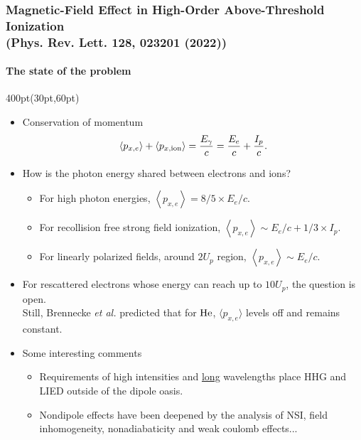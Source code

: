 \begin{frame}
\frametitle{Magnetic-Field Effect in High-Order Above-Threshold Ionization \\
\small (Phys. Rev. Lett. 128, 023201 (2022))}
\framesubtitle{The state of the problem}

\small
\begin{textblock*}{400pt}(30pt,60pt)
\begin{itemize}
\item Conservation of momentum
\begin{align}
\footnotesize
\left\langle p_{x,e} \right\rangle + \left\langle p_{x,\rm ion} \right\rangle
 = \frac{E_\gamma}{c} 
 = \frac{E_e}{c} + \frac{I_p}{c}. \nonumber
\end{align}
\item How is the photon energy shared between electrons and ions?
\begin{itemize}
 \footnotesize
 \item[$\bullet$] For high photon energies, \hspace{10pt}
   $\left\langle p_{x,e}\right\rangle = 8/5\times E_e/c.$
 \item[$\bullet$] For recollision free strong field ionization, %
 \hspace{10pt}
   $\left\langle p_{x,e} \right\rangle \sim E_e/c + 1/3\times I_p.$
 \item[$\bullet$] For linearly polarized fields, around $2U_p$ region, 
   \hspace{10pt}
   $\left\langle p_{x,e}\right\rangle \sim E_e/c.$
\end{itemize}
\item For rescattered electrons whose energy can reach up to $10U_p$, 
the question is open. \\
Still, Brennecke \textit{et al.} predicted that for $\rm He$,
$\langle p_{x,e}\rangle$ levels off and remains constant.
\item Some interesting comments
\begin{itemize}
 \footnotesize
 \item[$\bullet$] Requirements of high intensities and \underline{long} 
wavelengths place HHG and LIED outside of the dipole oasis.
 \item[$\bullet$] Nondipole effects have been deepened by the analysis 
of NSI, field inhomogeneity, nonadiabaticity and weak coulomb effects...
\end{itemize}


\end{itemize}
\end{textblock*}
\end{frame}
